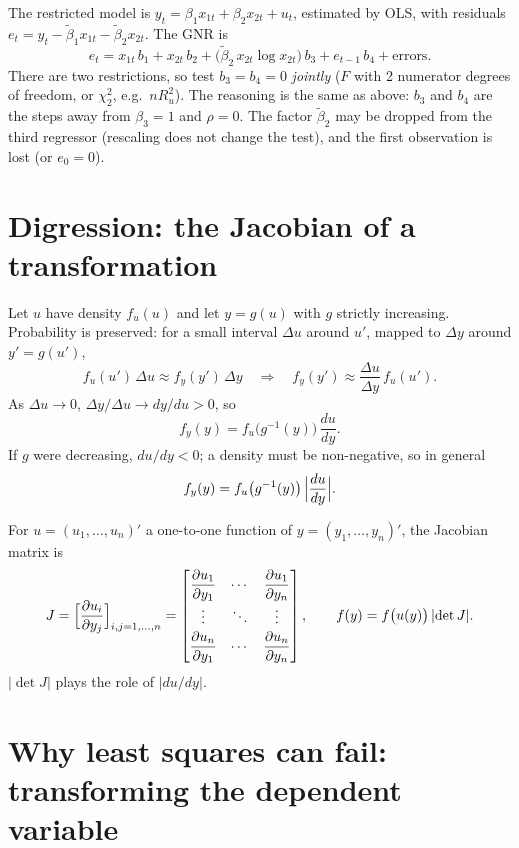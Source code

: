 \documentclass[11pt]{article}
\begin{document}
The restricted model is $y_{t}=\beta_{1}x_{1t}+\beta_{2}x_{2t}+u_{t}$, estimated by OLS, with
residuals $e_{t}=y_{t}-\tilde\beta_{1}x_{1t}-\tilde\beta_{2}x_{2t}$. The GNR is
\[ e_{t}=x_{1t}\,b_{1}+x_{2t}\,b_{2}+\bigl(\tilde\beta_{2}\,x_{2t}\log x_{2t}\bigr)\,b_{3}
   +e_{t-1}\,b_{4}+\text{errors}. \]
There are two restrictions, so test $b_{3}=b_{4}=0$ \emph{jointly} ($F$ with 2 numerator
degrees of freedom, or $\chi^{2}_{2}$, e.g.\ $nR^{2}_{u}$). The reasoning is the same as above:
$b_{3}$ and $b_{4}$ are the steps away from $\beta_{3}=1$ and $\rho=0$. The factor
$\tilde\beta_{2}$ may be dropped from the third regressor (rescaling does not change the test),
and the first observation is lost (or $e_{0}=0$).

\section{Digression: the Jacobian of a transformation}

Let $u$ have density $f_{u}(u)$ and let $y=g(u)$ with $g$ strictly increasing. Probability is
preserved: for a small interval $\Delta u$ around $u'$, mapped to $\Delta y$ around $y'=g(u')$,
\[ f_{u}(u')\,\Delta u\approx f_{y}(y')\,\Delta y
   \quad\Longrightarrow\quad f_{y}(y')\approx\frac{\Delta u}{\Delta y}\,f_{u}(u'). \]
As $\Delta u\to0$, $\Delta y/\Delta u\to dy/du>0$, so
\[ f_{y}(y)=f_{u}\bigl(g^{-1}(y)\bigr)\,\frac{du}{dy}. \]
If $g$ were decreasing, $du/dy<0$; a density must be non-negative, so in general
\[ f_{y}(y)=f_{u}\bigl(g^{-1}(y)\bigr)\,\Bigl|\frac{du}{dy}\Bigr| . \]

For $u=(u_{1},\ldots,u_{n})'$ a one-to-one function of $y=(y_{1},\ldots,y_{n})'$, the Jacobian
matrix is
\[ J=\Bigl[\frac{\partial u_{i}}{\partial y_{j}}\Bigr]_{i,j=1,\ldots,n}
   =\begin{bmatrix}
     \dfrac{\partial u_{1}}{\partial y_{1}} & \cdots & \dfrac{\partial u_{1}}{\partial y_{n}}\\[6pt]
     \vdots & \ddots & \vdots\\[2pt]
     \dfrac{\partial u_{n}}{\partial y_{1}} & \cdots & \dfrac{\partial u_{n}}{\partial y_{n}}
    \end{bmatrix},
   \qquad f(y)=f\bigl(u(y)\bigr)\,\lvert\det J\rvert . \]
$\lvert\det J\rvert$ plays the role of $\lvert du/dy\rvert$.

\section{Why least squares can fail: transforming the dependent variable}
\end{document}
